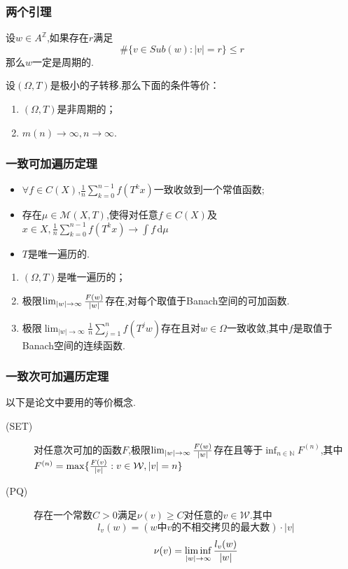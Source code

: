 \documentclass[compress,red]{beamer}
\begin{document}
\begin{frame}
\frametitle{两个引理}
\begin{lemma}
设$w\in A^{\mathbb{Z}}$,如果存在$r$满足
$$\#\{v\in Sub(w):|v|=r\}\leq r$$
那么$w$一定是周期的.
\end{lemma}
\pause
\begin{lemma}
\label{l:1}
设$(\Omega,T)$是极小的子转移.那么下面的条件等价：
\begin{enumerate}
\item $(\Omega,T)$是非周期的；
\item $m(n)\rightarrow \infty,n\rightarrow \infty$.
\end{enumerate}
\end{lemma}
\end{frame}



\begin{frame}
\frametitle{一致可加遍历定理}
\begin{theorem}
\begin{itemize}
\item $\forall f\in C(X)$,$\frac{1}{n}\sum_{k=0}^{n-1}f(T^kx)$一致收敛到一个常值函数;
\item 存在$\mu\in\mathcal{M}(X,T)$,使得对任意$f\in C(X)$及$x\in X,\frac{1}{n}\sum_{k=0}^{n-1}f(T^kx)\rightarrow \int\!f \, \mathrm d \mu$
\item $T$是唯一遍历的.
\end{itemize}
\end{theorem}
\pause
\begin{theorem}
\begin{enumerate}
\item $(\Omega,T)$是唯一遍历的；
\item 极限$\lim_{|w|\to \infty}{F(w)\over |w|}$存在,对每个取值于Banach空间的可加函数.
\item 极限$\lim_{|w|\to \infty}\frac{1}{n}\sum_{j=1}^n{f(T^jw)}$存在且对$w\in \Omega$一致收敛,其中$f$是取值于Banach空间的连续函数.
\end{enumerate}
\end{theorem}
\end{frame}


\begin{frame}
\frametitle{一致次可加遍历定理}
\begin{definition}
以下是论文中要用的等价概念.
\begin{description}
\item[(SET)] 对任意次可加的函数$F$,极限$\lim_{|w|\to \infty}{F(w)\over |w|}$存在且等于$\inf_{n\in \mathbb{N}}F^{(n)}$,其中$F^{(n)}=\max\{{F(v)\over |v|}:v\in\mathcal{W},|v|=n\}$
\item[(PQ)] 存在一个常数$C>0$满足$\nu(v)\geq C$对任意的$v\in \mathcal{W}$.其中
$$l_v(w)=(w\text{中}v\text{的不相交拷贝的最大数})\cdot |v|$$
$$\nu(v)=\liminf_{|w|\to \infty}{l_v(w)\over |w|}$$
\end{description}
\end{definition}
\end{frame}
\end{document}
